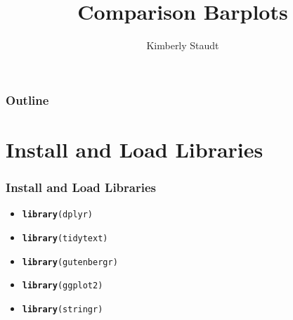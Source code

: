 \documentclass{beamer}\usepackage[]{graphicx}\usepackage[]{color}
\makeatletter
\newcommand{\hlstd}[1]{\textcolor[rgb]{0.345,0.345,0.345}{#1}}%
\newcommand{\hlkwd}[1]{\textcolor[rgb]{0.737,0.353,0.396}{\textbf{#1}}}%
\newenvironment{kframe}{%
 \def\at@end@of@kframe{}%
 \ifinner\ifhmode%
  \def\at@end@of@kframe{\end{minipage}}%
  \begin{minipage}{\columnwidth}%
 \fi\fi%
 \def\FrameCommand##1{\hskip\@totalleftmargin \hskip-\fboxsep
 \colorbox{shadecolor}{##1}\hskip-\fboxsep
     \hskip-\linewidth \hskip-\@totalleftmargin \hskip\columnwidth}%
 \MakeFramed {\advance\hsize-\width
   \@totalleftmargin\z@ \linewidth\hsize
   \@setminipage}}%
 {\par\unskip\endMakeFramed%
 \at@end@of@kframe}
\newenvironment{knitrout}{}{} %
\makeatother
\begin{document}
\title{Comparison Barplots}
\author{Kimberly Staudt}

\begin{frame}
  \titlepage
\end{frame}

\begin{frame}[fragile]
  \frametitle{Outline}
    \tableofcontents
\end{frame}

\section{Install and Load Libraries}
\begin{frame}[fragile]
  \frametitle{Install and Load Libraries}
    \begin{itemize}
      \item<1->
\begin{knitrout}
\color{fgcolor}\begin{kframe}
\begin{alltt}
\hlkwd{library}\hlstd{(dplyr)}
\end{alltt}
\end{kframe}
\end{knitrout}
      \item<2->
\begin{knitrout}
\color{fgcolor}\begin{kframe}
\begin{alltt}
\hlkwd{library}\hlstd{(tidytext)}
\end{alltt}
\end{kframe}
\end{knitrout}
    \item<3->
\begin{knitrout}
\color{fgcolor}\begin{kframe}
\begin{alltt}
\hlkwd{library}\hlstd{(gutenbergr)}
\end{alltt}
\end{kframe}
\end{knitrout}
    \item<4->
\begin{knitrout}
\color{fgcolor}\begin{kframe}
\begin{alltt}
\hlkwd{library}\hlstd{(ggplot2)}
\end{alltt}
\end{kframe}
\end{knitrout}
    \item<5->
\begin{knitrout}
\color{fgcolor}\begin{kframe}
\begin{alltt}
\hlkwd{library}\hlstd{(stringr)}
\end{alltt}
\end{kframe}
\end{knitrout}
    

\end{itemize}
\end{frame}
\end{document}
